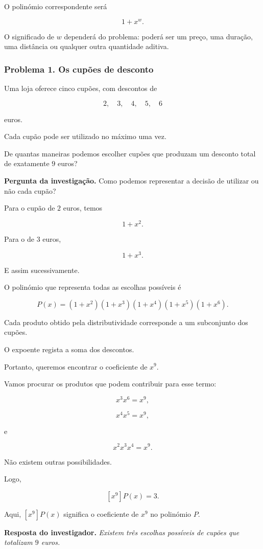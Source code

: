 \documentclass[11pt,a4paper,oneside]{book}
\newcommand{\Pergunta}[1]{\begin{perguntabox}\textbf{Pergunta da investigação.} #1\end{perguntabox}}
\newcommand{\Resposta}[1]{\textcolor{verdeescuro}{\textbf{Resposta do investigador.}} \emph{#1}\par}
\begin{document}
O polinómio correspondente será

\[
1+x^w.
\]

O significado de $w$ dependerá
do problema: poderá ser um preço,
uma duração, uma distância
ou qualquer outra quantidade aditiva.

\subsubsection*{Problema 1. Os cupões de desconto}

Uma loja oferece cinco cupões,
com descontos de

\[
2,\quad3,\quad4,\quad5,\quad6
\]

euros.

Cada cupão pode ser utilizado
no máximo uma vez.

De quantas maneiras podemos escolher
cupões que produzam um desconto
total de exatamente $9$ euros?

\Pergunta{Como podemos representar a decisão
de utilizar ou não cada cupão?}

Para o cupão de $2$ euros, temos

\[
1+x^2.
\]

Para o de $3$ euros,

\[
1+x^3.
\]

E assim sucessivamente.

O polinómio que representa
todas as escolhas possíveis é

\[
P(x)=
(1+x^2)(1+x^3)(1+x^4)
(1+x^5)(1+x^6).
\]

Cada produto obtido pela distributividade
corresponde a um subconjunto dos cupões.

O expoente regista a soma dos descontos.

Portanto, queremos encontrar
o coeficiente de $x^9$.

Vamos procurar os produtos
que podem contribuir para esse termo:

\[
x^3x^6=x^9,
\]

\[
x^4x^5=x^9,
\]

e

\[
x^2x^3x^4=x^9.
\]

Não existem outras possibilidades.

Logo,

\[
\boxed{[x^9]P(x)=3}.
\]

Aqui, $[x^9]P(x)$ significa
o coeficiente de $x^9$ no polinómio $P$.

\Resposta{Existem três escolhas possíveis
de cupões que totalizam $9$ euros.}
\end{document}
